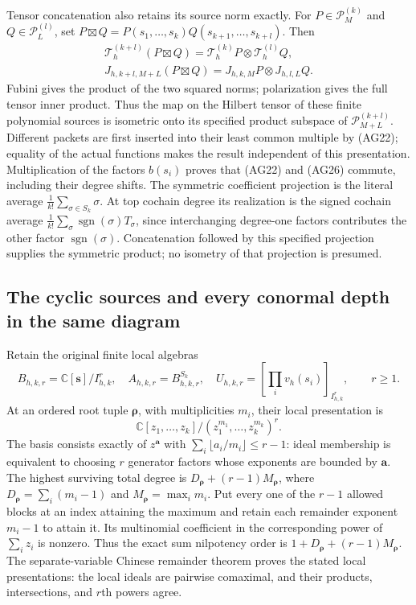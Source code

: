 Tensor concatenation also retains its source norm exactly.  For
$P\in\mathcal P_M^{(k)}$ and $Q\in\mathcal P_L^{(l)}$, set
$P\boxtimes Q=P(s_1,\ldots,s_k)Q(s_{k+1},\ldots,s_{k+l})$.
Then
\[
 \begin{gathered}
 \mathcal T_h^{(k+l)}(P\boxtimes Q)
       =\mathcal T_h^{(k)}P\otimes\mathcal T_h^{(l)}Q,\\
 J_{h,k+l,M+L}(P\boxtimes Q)=J_{h,k,M}P\otimes J_{h,l,L}Q.
 \end{gathered}
 \tag{AG26}
\]
Fubini gives the product of the two squared norms; polarization
gives the full tensor inner product.  Thus the map on the Hilbert
tensor of these finite polynomial sources is isometric onto its
specified product subspace of $\mathcal P_{M+L}^{(k+l)}$.
Different packets are first inserted into their least common
multiple by (AG22); equality of the actual functions makes the
result independent of this presentation.  Multiplication of the
factors $b(s_i)$ proves that (AG22) and (AG26) commute, including
their degree shifts.  The symmetric coefficient projection is the
literal average $\frac1{k!}\sum_{\sigma\in S_k}\sigma$.
At top cochain degree its realization is the signed cochain
average $\frac1{k!}\sum_\sigma\operatorname{sgn}(\sigma)T_\sigma$,
since interchanging degree-one factors contributes the other
factor $\operatorname{sgn}(\sigma)$.  Concatenation followed by
this specified projection supplies the symmetric product; no
isometry of that projection is presumed.

\subsection{The cyclic sources and every conormal depth in the same diagram}

Retain the original finite local algebras
\[
 B_{h,k,r}=\mathbb C[\mathbf s]/I_{h,k}^r,\quad
 A_{h,k,r}=B_{h,k,r}^{S_k},\quad
 U_{h,k,r}=[\prod_i v_h(s_i)]_{I_{h,k}^r},\qquad r\ge1.
 \tag{AG27}
\]
At an ordered root tuple $\boldsymbol\rho$, with multiplicities
$m_i$, their local presentation is
\[
 \mathbb C[z_1,\ldots,z_k]/(z_1^{m_1},\ldots,z_k^{m_k})^r.
\]
The basis consists exactly of $z^{\mathbf a}$ with
$\sum_i\lfloor a_i/m_i\rfloor\le r-1$: ideal membership is
equivalent to choosing $r$ generator factors whose exponents are
bounded by $\mathbf a$.  The highest surviving total degree is
$D_{\boldsymbol\rho}+(r-1)M_{\boldsymbol\rho}$, where
$D_{\boldsymbol\rho}=\sum_i(m_i-1)$ and
$M_{\boldsymbol\rho}=\max_i m_i$.  Put every one of the $r-1$
allowed blocks at an index attaining the maximum and retain each
remainder exponent $m_i-1$ to attain it.  Its multinomial coefficient
in the corresponding power of $\sum_i z_i$ is nonzero.  Thus
the exact sum nilpotency order is
$1+D_{\boldsymbol\rho}+(r-1)M_{\boldsymbol\rho}$.
The separate-variable Chinese remainder theorem proves the stated
local presentations: the local ideals are pairwise comaximal,
and their products, intersections, and $r$th powers agree.

